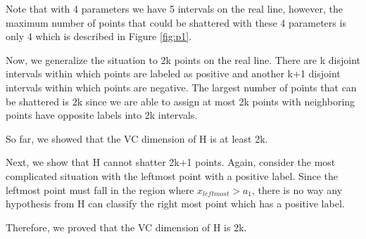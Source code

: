 Note that with 4 parameters we have 5 intervals on the real line, however, the maximum number of points that could be shattered with these 4 parameters is only 4 which is described in Figure \ref{fig:p1}.

Now, we generalize the situation to 2k points on the real line. There are k disjoint intervals within which points are labeled as positive and another k+1 disjoint intervals within which points are negative. The largest number of points that can be shattered is 2k since we are able to assign at most 2k points with neighboring points have opposite labels into 2k intervals.

So far, we showed that the VC dimension of H is at least 2k.

Next, we show that H cannot shatter 2k+1 points. Again, consider the most complicated situation with the leftmost point with a positive label. Since the leftmost point must fall in the region where $x_{leftmost}>a_1$, there is no way any hypothesis from H can classify the right most point which has a positive label.

Therefore, we proved that the VC dimension of H is 2k.








